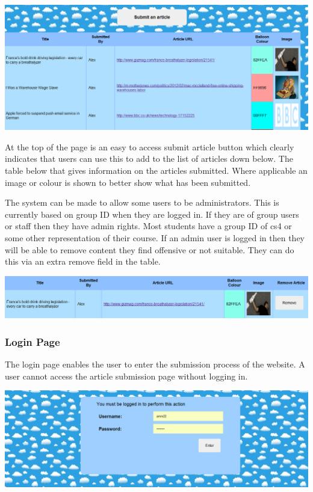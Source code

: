 \includegraphics[width=\textwidth]{Diagrams/Website-ContentViewer}

At the top of the page is an easy to access submit article button which clearly indicates that users can use this to add to the list of articles down below. The table below that gives information on the articles submitted. Where applicable an image or colour is shown to better show what has been submitted.

The system can be made to allow some users to be administrators. This is currently based on group ID when they are logged in. If they are of group users or staff then they have admin rights. Most students have a group ID of cs4 or some other representation of their course. If an admin user is logged in then they will be able to remove content they find offensive or not suitable. They can do this via an extra remove field in the table.

\includegraphics[width=\textwidth]{Diagrams/Website-RemoveContent}

\subsubsection{Login Page}
The login page enables the user to enter the submission process of the website. A user cannot access the article submission page without logging in. 

\includegraphics[width=\textwidth]{Diagrams/Website-Login}

